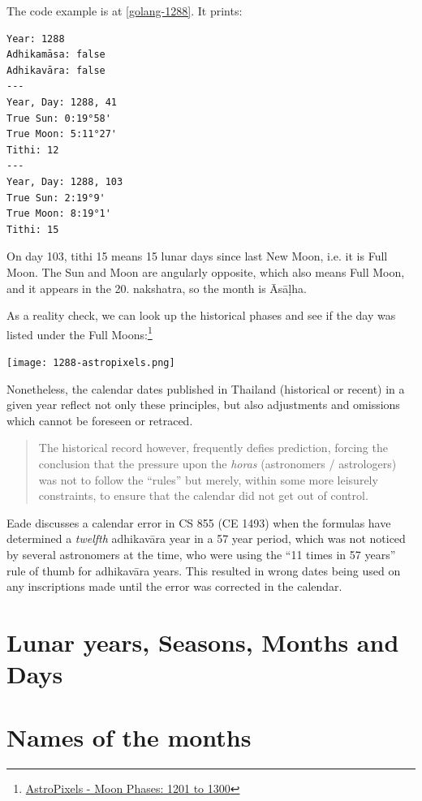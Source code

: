\documentclass[11pt,oneside]{memoir-article}
\begin{document}
The code example is at \ref{golang-1288}. It prints:

\begin{verbatim}
Year: 1288
Adhikamāsa: false
Adhikavāra: false
---
Year, Day: 1288, 41
True Sun: 0:19°58'
True Moon: 5:11°27'
Tithi: 12
---
Year, Day: 1288, 103
True Sun: 2:19°9'
True Moon: 8:19°1'
Tithi: 15
\end{verbatim}

On day 103, tithi 15 means 15 lunar days since last New Moon, i.e. it is Full
Moon. The Sun and Moon are angularly opposite, which also means Full Moon, and
it appears in the 20. nakshatra, so the month is Āsāḷha.

As a reality check, we can look up the historical phases and see if
the day was listed under the Full Moons:\footnote{\href{http://astropixels.com/ephemeris/phasescat/phases1201.html}{AstroPixels - Moon Phases: 1201 to 1300}}

{\centering
\texttt{[image: 1288-astropixels.png]}
\par}

Nonetheless, the calendar dates published in Thailand (historical or
recent) in a given year reflect not only these principles, but also
adjustments and omissions which cannot be foreseen or retraced.

\begin{quote}
The historical record however, frequently defies prediction, forcing
the conclusion that the pressure upon the \emph{horas} (astronomers /
astrologers) was not to follow the ``rules'' but merely, within some
more leisurely constraints, to ensure that the calendar did not get
out of control.\autocite{eade1995calendrical}
\end{quote}

Eade discusses a calendar error in CS 855 (CE 1493) when the formulas have
determined a \emph{twelfth} adhikavāra year in a 57 year period, which was not
noticed by several astronomers at the time, who were using the ``11 times in 57
years'' rule of thumb for adhikavāra years. This resulted in wrong dates being
used on any inscriptions made until the error was corrected in the
calendar.\autocite{eade2007irregular}

\section{Lunar years, Seasons, Months and Days}
\label{sec-4-1}
\label{years-seasons}

\section{Names of the months}
\label{sec-4-2}
\end{document}
